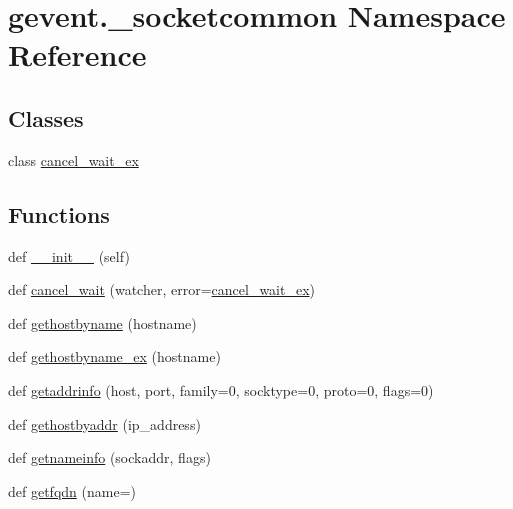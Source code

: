 \hypertarget{namespacegevent_1_1__socketcommon}{}\section{gevent.\+\_\+socketcommon Namespace Reference}
\label{namespacegevent_1_1__socketcommon}
\subsection*{Classes}
\begin{DoxyCompactItemize}
\item 
class \hyperlink{classgevent_1_1__socketcommon_1_1cancel__wait__ex}{cancel\+\_\+wait\+\_\+ex}
\end{DoxyCompactItemize}
\subsection*{Functions}
\begin{DoxyCompactItemize}
\item 
def \hyperlink{namespacegevent_1_1__socketcommon_a93106cd28e74e4e80dfd3f9d74661ee9}{\+\_\+\+\_\+init\+\_\+\+\_\+} (self)
\item 
def \hyperlink{namespacegevent_1_1__socketcommon_afa0b81d7e394944cf3c3401619b81b97}{cancel\+\_\+wait} (watcher, error=\hyperlink{classgevent_1_1__socketcommon_1_1cancel__wait__ex}{cancel\+\_\+wait\+\_\+ex})
\item 
def \hyperlink{namespacegevent_1_1__socketcommon_a2ee0bbc0ffce8551ebdb2359e4c34f32}{gethostbyname} (hostname)
\item 
def \hyperlink{namespacegevent_1_1__socketcommon_a9200bf7e6fcf07e5a4303eb2d92b3c95}{gethostbyname\+\_\+ex} (hostname)
\item 
def \hyperlink{namespacegevent_1_1__socketcommon_aba53a9d7d131e2932c207022978aa824}{getaddrinfo} (host, port, family=0, socktype=0, proto=0, flags=0)
\item 
def \hyperlink{namespacegevent_1_1__socketcommon_a9fc88bc23729e5962781f8a89b11016a}{gethostbyaddr} (ip\+\_\+address)
\item 
def \hyperlink{namespacegevent_1_1__socketcommon_a5ad90a103e5f6ff1d4bc8a46321cb519}{getnameinfo} (sockaddr, flags)
\item 
def \hyperlink{namespacegevent_1_1__socketcommon_a9cc84a90b58f69fdb4b378af2c174a40}{getfqdn} (name=\textquotesingle{}\textquotesingle{})
\end{DoxyCompactItemize}
